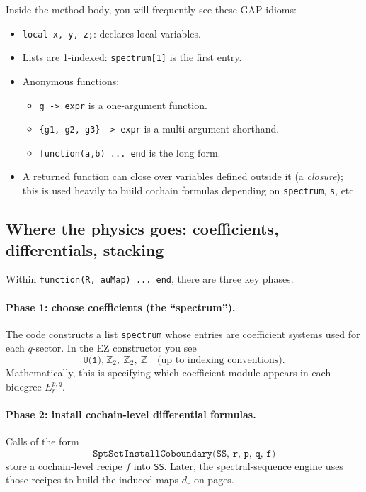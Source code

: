 \documentclass{SciPost}
\begin{document}
Inside the method body, you will frequently see these GAP idioms:
\begin{itemize}
    \item \texttt{local x, y, z;}: declares local variables.
    \item Lists are 1-indexed: \texttt{spectrum[1]} is the first entry.
    \item Anonymous functions:
    \begin{itemize}
        \item \texttt{g -> expr} is a one-argument function.
        \item \texttt{\{g1, g2, g3\} -> expr} is a multi-argument shorthand.
        \item \texttt{function(a,b) ... end} is the long form.
    \end{itemize}
    \item A returned function can close over variables defined outside it (a \emph{closure}); this is used heavily to build cochain formulas depending on \texttt{spectrum}, \texttt{s}, etc.
\end{itemize}

\subsection{Where the physics goes: coefficients, differentials, stacking}

Within \texttt{function(R, auMap) ... end}, there are three key phases.

\paragraph{Phase 1: choose coefficients (the ``spectrum'').}
The code constructs a list \texttt{spectrum} whose entries are coefficient systems used for each $q$-sector.
In the EZ constructor you see
\begin{equation}
	\texttt{U(1),}\ \mathbb{Z}_2,\ \mathbb{Z}_2,\ \mathbb{Z}\quad\text{(up to indexing conventions).}
\end{equation}
Mathematically, this is specifying which coefficient module appears in each bidegree $E_r^{p,q}$.

\paragraph{Phase 2: install cochain-level differential formulas.}
Calls of the form
\begin{equation}
	\texttt{SptSetInstallCoboundary(SS, r, p, q, f)}
\end{equation}
store a cochain-level recipe $f$ into \texttt{SS}.
Later, the spectral-sequence engine uses those recipes to build the induced maps $d_r$ on pages.
\end{document}
